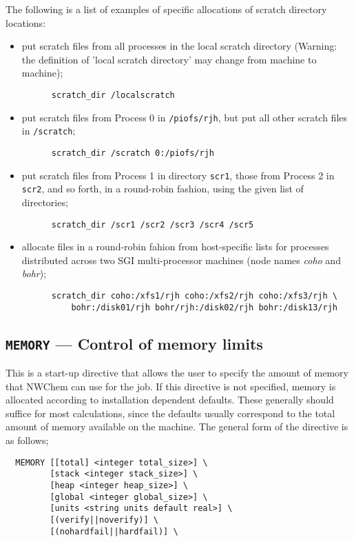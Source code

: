 The following is a list of examples of specific allocations of scratch
directory locations:
\begin{itemize}
\item put scratch files from all processes in the local scratch directory 
(Warning: the definition of 'local scratch directory' may change from 
machine to machine);
\begin{verbatim}
      scratch_dir /localscratch
\end{verbatim}
\item put scratch files from Process 0 in \verb+/piofs/rjh+, but put all 
other scratch files in \verb+/scratch+;
\begin{verbatim}
      scratch_dir /scratch 0:/piofs/rjh
\end{verbatim}
\item put scratch files from Process 1 in directory \verb+scr1+, those from
Process 2 in \verb+scr2+, and so forth, in a round-robin fashion, using the
given list of directories;
\begin{verbatim}
      scratch_dir /scr1 /scr2 /scr3 /scr4 /scr5
\end{verbatim}
\item allocate files in a round-robin fahion from
  host-specific lists for processes distributed across two
 SGI multi-processor machines (node names {\it coho} and {\it bohr});
\begin{verbatim}
      scratch_dir coho:/xfs1/rjh coho:/xfs2/rjh coho:/xfs3/rjh \
          bohr:/disk01/rjh bohr/rjh:/disk02/rjh bohr:/disk13/rjh
\end{verbatim}
\end{itemize}

\subsection{{\tt MEMORY} --- Control of memory limits}

This is a start-up directive that allows the user to specify the
amount of memory that NWChem can use for the job.  If this directive
is not specified, memory is allocated according to installation
dependent defaults.  These generally should suffice for most
calculations, since the defaults usually correspond to the total amount
of memory available on the machine.  The general form of the directive
is as follows;

\begin{verbatim}
  MEMORY [[total] <integer total_size>] \
         [stack <integer stack_size>] \
         [heap <integer heap_size>] \
         [global <integer global_size>] \
         [units <string units default real>] \
         [(verify||noverify)] \
         [(nohardfail||hardfail)] \
\end{verbatim}

